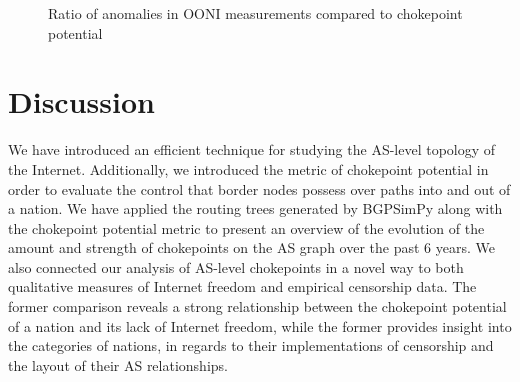 \documentclass{article}
\begin{document}
\begin{multicols}{2}
\begin{figure}
\begin{subfigure}[b]{0.4\linewidth}
	\end{subfigure}


	\caption{Ratio of anomalies in OONI measurements compared to chokepoint potential}\label{fig:ooni}
\end{figure}

\section{Discussion}

We have introduced an efficient technique for studying the AS-level topology of the Internet. Additionally,
we introduced the metric of chokepoint potential in order to evaluate the control that border nodes possess
over paths into and out of a nation. We have applied the routing trees generated by BGPSimPy along with the
chokepoint potential metric to present an overview of the evolution of the amount and strength of chokepoints
on the AS graph over the past 6 years. We also connected our analysis of AS-level chokepoints in a novel way to
both qualitative measures of Internet freedom and empirical censorship data. The former comparison reveals
a strong relationship between the chokepoint potential of a nation and its lack of Internet freedom, while the
former provides insight into the categories of nations, in regards to their implementations of censorship and
the layout of their AS relationships.

\end{multicols}



\end{document}
